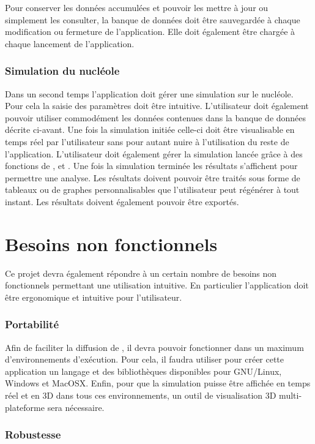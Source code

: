 Pour conserver les données accumulées et pouvoir les mettre à jour ou
simplement les consulter, la banque de données doit être sauvegardée à
chaque modification ou fermeture de l'application. Elle doit également
être chargée à chaque lancement de l'application.

\subsubsection{Simulation du nucléole}
Dans un second temps l'application doit gérer une simulation sur le
nucléole. Pour cela la saisie des paramètres doit être
intuitive. L'utilisateur doit également pouvoir utiliser commodément
les données contenues dans la banque de données décrite ci-avant. Une
fois la simulation initiée celle-ci doit être visualisable en temps
réel par l'utilisateur sans pour autant nuire à l'utilisation du reste
de l'application. L'utilisateur doit également gérer la simulation
lancée grâce à des fonctions de ,  et
. Une fois la simulation terminée les résultats s'affichent
pour permettre une analyse. Les résultats doivent pouvoir être traités
sous forme de tableaux ou de graphes personnalisables que
l'utilisateur peut régénérer à tout instant. Les résultats doivent
également pouvoir être exportés.

\section{Besoins non fonctionnels}
Ce projet devra également répondre à un certain nombre de besoins non
fonctionnels permettant une utilisation intuitive. En particulier
l'application doit être ergonomique et intuitive pour l'utilisateur.

\subsubsection{Portabilité}

Afin de faciliter la diffusion de \NQ, il devra pouvoir fonctionner
dans un maximum d'environnements d'exécution. Pour cela, il faudra
utiliser pour créer cette application un langage et des bibliothèques
disponibles pour GNU/Linux, Windows et MacOSX. Enfin, pour que la
simulation puisse être affichée en temps réel et en 3D dans tous ces
environnements, un outil de visualisation 3D multi-plateforme sera
nécessaire.

\subsubsection{Robustesse}

